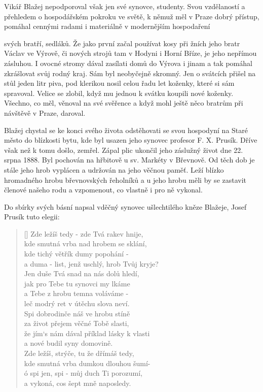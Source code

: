 \documentclass[../dejiny-rodu-prusiku.tex]{subfiles}
\begin{document}
Vikář Blažej nepodporoval však jen své synovce, studenty. Svou vzdělaností a přehledem o hospodářském pokroku ve světě, k němuž měl v Praze dobrý přístup, pomáhal cennými radami i materiálně v modernějším hospodaření

svých bratří, sedláků. Že jako první začal používat kosy při žních jeho bratr Václav ve Výrově, či nových strojů tam v Hodyni i Horní Bříze, je jeho nepřímou zásluhou. I ovocné stromy dával zasílati domů do Výrova i jinam a tak pomáhal zkrášlovat svůj rodný kraj. Sám byl neobyčejně skromný. Jen o svátcích přišel na stůl jeden litr piva, pod klerikou nosil celou řadu let koženky, které si sám spravoval. Velice se zlobil, když mu jednou k svátku koupili nové koženky. Všechno, co měl, věnoval na své svěřence a když mohl ještě něco bratrům při návštěvě v Praze, daroval.

Blažej chystal se ke konci svého života odstěhovati se svou hospodyní na Staré město do  blízkosti bytu, kde byl usazen jeho synovec profesor F. X. Prusík. Dříve však než k tomu došlo, zemřel. Zápal plic ukončil jeho záslužný život dne 22. srpna 1888. Byl pochován na hřbitově u sv. Markéty v Břevnově. Od těch dob je stále jeho hrob vyplácen a udržován na jeho věčnou paměť. Leží blízko hromadného hrobu břevnovských řeholníků a u jeho hrobu měli by se zastavit členové našeho rodu a vzpomenout, co vlastně i pro ně vykonal.

Do sbírky svých básní napsal vděčný synovec ušlechtilého kněze Blažeje, Josef Prusík tuto elegii:

\settowidth{\versewidth}{a duma - list, jenž uschlý, hrob Tvůj kryje?}
\begin{verse}[\versewidth]
Zde ležíš tedy - zde Tvá rakev hnije, \\
kde smutná vrba nad hrobem se sklání, \\
kde tichý větřík dumy popohání - \\
a duma - list, jenž uschlý, hrob Tvůj kryje? \\
Jen duše Tvá snad na nás dolů hledí, \\
jak pro Tebe tu synovci my lkáme \\
a Tebe z hrobu temna voláváme - \\
leč modrý ret v útěchu slova neví. \\
Spi dobrodinče náš ve hrobu stíně \\
za život přejem věčné Tobě slasti, \\
že jím‘s nám dával příklad lásky k vlasti \\
a nové budil syny domovině. \\
Zde ležíš,  strýče, tu že dřímáš tedy, \\
kde smutná vrba dumkou dlouhou šumí- \\
ó spi jen, spi - můj duch Ti porozumí, \\
a vykoná, cos šept mně naposledy.
\end{verse}
\end{document}
